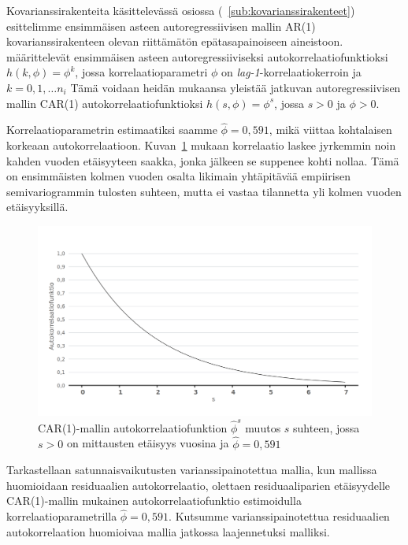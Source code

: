 \documentclass[finnish]{docopts}
\begin{document}
Kovarianssirakenteita käsittelevässä osiossa (~\ref{sub:kovarianssirakenteet}) esittelimme ensimmäisen asteen autoregressiivisen mallin AR(1) kovarianssirakenteen olevan riittämätön epätasapainoiseen aineistoon. \cite{pinheiro00} määrittelevät ensimmäisen asteen autoregressiiviseksi autokorrelaatiofunktioksi $h(k,\phi)=\phi^k$, jossa korrelaatioparametri $\phi$ on \textit{lag-1}-korrelaatiokerroin ja $k=0,1,\dots n_i$ Tämä voidaan heidän mukaansa yleistää jatkuvan autoregressiivisen mallin CAR(1) autokorrelaatiofunktioksi $h(s,\phi)=\phi^s$, jossa $s>0$ ja $\phi>0$.

Korrelaatioparametrin estimaatiksi saamme $\hat{\phi} = 0,591$, mikä viittaa kohtalaisen korkeaan autokorrelaatioon. Kuvan~\ref{fig:lme2_corfunc} mukaan korrelaatio laskee jyrkemmin noin kahden vuoden etäisyyteen saakka, jonka jälkeen se suppenee kohti nollaa. Tämä on ensimmäisten kolmen vuoden osalta likimain yhtäpitävää empiirisen semivariogrammin tulosten suhteen, mutta ei vastaa tilannetta yli kolmen vuoden etäisyyksillä.\\

\begin{figure}[H]
\centering
  \includegraphics[scale=0.8]{kuvaajat/lme2_corfunc.png}
  \caption{CAR(1)-mallin autokorrelaatiofunktion $\hat{\phi}^s$ muutos $s$ suhteen, jossa $s>0$ on mittausten etäisyys vuosina ja $\hat{\phi} = 0,591$}
  \label{fig:lme2_corfunc}
\end{figure}

Tarkastellaan satunnaisvaikutusten varianssipainotettua mallia, kun mallissa huomioidaan residuaalien autokorrelaatio, olettaen residuaaliparien etäisyydelle CAR(1)-mallin mukainen autokorrelaatiofunktio estimoidulla korrelaatioparametrilla $\hat{\phi} = 0,591$. Kutsumme varianssipainotettua residuaalien autokorrelaation huomioivaa mallia jatkossa laajennetuksi malliksi.\\
\end{document}
